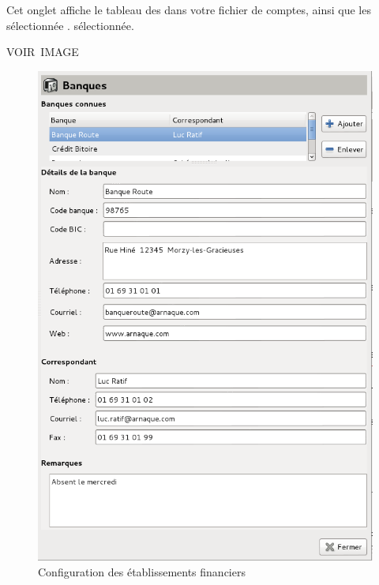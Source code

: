 Cet onglet affiche le tableau des  dans votre fichier de comptes, ainsi que les  \ifIllustration sélectionnée . 
\else sélectionnée.
\fi




VOIR IMAGE



\ifIllustration
\begin{figure}[ht!]
\begin{center}
\includegraphics[scale=0.48]{image/screenshot/setup_bank}
\end{center}
\caption{Configuration des établissements financiers}
\label{setup-bank-img}
\end{figure}
\fi


